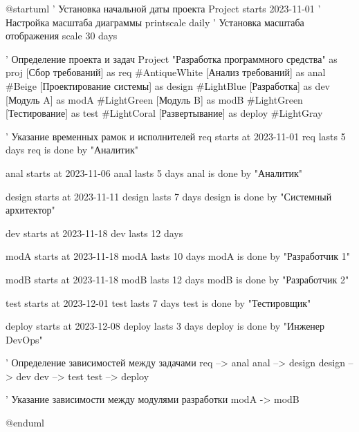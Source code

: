@startuml
' Установка начальной даты проекта
Project starts 2023-11-01
' Настройка масштаба диаграммы
printscale daily
' Установка масштаба отображения
scale 30 days

' Определение проекта и задач
Project "Разработка программного средства" as proj {
    [Сбор требований] as req #AntiqueWhite
    [Анализ требований] as anal #Beige
    [Проектирование системы] as design #LightBlue
    [Разработка] as dev {
        [Модуль A] as modA #LightGreen
        [Модуль B] as modB #LightGreen
    }
    [Тестирование] as test #LightCoral
    [Развертывание] as deploy #LightGray
}

' Указание временных рамок и исполнителей
req starts at 2023-11-01
req lasts 5 days
req is done by "Аналитик"

anal starts at 2023-11-06
anal lasts 5 days
anal is done by "Аналитик"

design starts at 2023-11-11
design lasts 7 days
design is done by "Системный архитектор"

dev starts at 2023-11-18
dev lasts 12 days

modA starts at 2023-11-18
modA lasts 10 days
modA is done by "Разработчик 1"

modB starts at 2023-11-18
modB lasts 12 days
modB is done by "Разработчик 2"

test starts at 2023-12-01
test lasts 7 days
test is done by "Тестировщик"

deploy starts at 2023-12-08
deploy lasts 3 days
deploy is done by "Инженер DevOps"

' Определение зависимостей между задачами
req --> anal
anal --> design
design --> dev
dev --> test
test --> deploy

' Указание зависимости между модулями разработки
modA -> modB

@enduml
